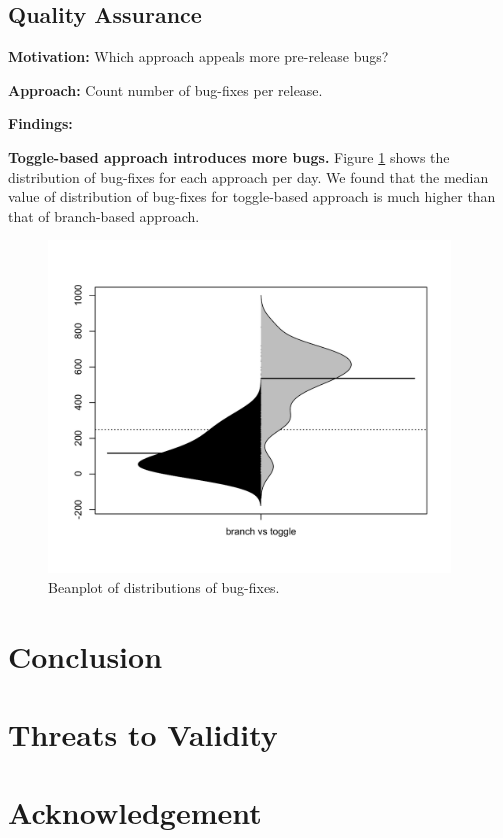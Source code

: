 \subsection{Quality Assurance}

\textbf{Motivation:}
Which approach appeals more pre-release bugs?

\textbf{Approach:}
Count number of bug-fixes per release.

\textbf{Findings:} 

\textbf{Toggle-based approach introduces more bugs.} Figure \ref{fig:bug} shows the distribution of bug-fixes for each approach per day. We found that the median value of distribution of bug-fixes for toggle-based approach is much higher than that of branch-based approach.

\begin{figure}
\includegraphics[width=0.95\textwidth]{figure/beforeAfterBug.pdf}
\caption{Beanplot of distributions of bug-fixes.}
\label{fig:bug}
\end{figure}



\section{Conclusion}

\section{Threats to Validity}

\section{Acknowledgement}





